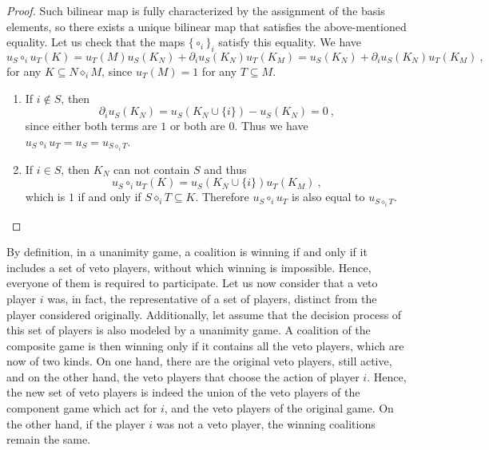 \documentclass[a4paper,12pt]{amsart}
\begin{document}
\begin{proof}
Such bilinear map is fully characterized by the assignment of the basis elements, so there exists a unique bilinear map that satisfies the above-mentioned equality. Let us check that the maps $\{\circ_i\}_i$ satisfy this equality. We have 
    \[
    u_S \circ_i u_T(K) = u_T(M)u_S(K_N) + \partial_i u_S(K_N)u_T(K_M) = u_S(K_N) + \partial_i u_S(K_N)u_T(K_M)~,
    \]
for any $K \subseteq N \diamond_i M$, since $u_T(M)=1$ for any $T \subseteq M$. 
\begin{enumerate}
\item If $i \notin S$, then
    \[
    \partial_i u_S(K_N) = u_S(K_N \cup \{i\}) - u_S(K_N) = 0~,
    \]
    since either both terms are $1$ or both are $0$. Thus we have $u_S \circ_i u_T = u_S = u_{S \diamond_i T}$. 
    
\item If $i \in S$, then $K_N$ can not contain $S$ and thus 
	\[
    u_S \circ_i u_T(K) = u_S(K_N \cup \{i\})u_T(K_M)~,
    \]
	which is $1$ if and only if $S \diamond_i T \subseteq K$. Therefore $u_S \circ_i u_T$ is also equal to $u_{S \diamond_i T}$. 
\end{enumerate} 
\end{proof}

\begin{remark}
By definition, in a unanimity game, a coalition is winning if and only if it includes a set of veto players, without which winning is impossible. Hence, everyone of them is required to participate. Let us now consider that a veto player \(i\) was, in fact, the representative of a set of players, distinct from the player considered originally. Additionally, let assume that the decision process of this set of players is also modeled by a unanimity game. A coalition of the composite game is then winning only if it contains all the veto players, which are now of two kinds. On one hand, there are the original veto players, still active, and on the other hand, the veto players that choose the action of player \(i\). Hence, the new set of veto players is indeed the union of the veto players of the component game which act for \(i\), and the veto players of the original game. On the other hand, if the player $i$ was not a veto player, the winning coalitions remain the same. 
\end{remark}
\end{document}

